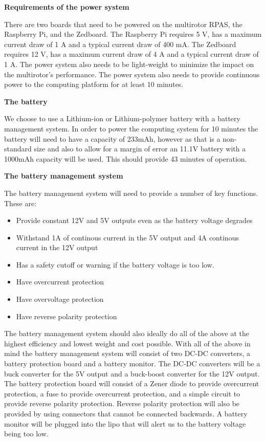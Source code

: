 \textbf{Requirements of the power system}

 There are two boards that need to be powered on the multirotor RPAS, the Raspberry Pi, and the Zedboard. The Raspberry Pi requires
5 V, has a maximum current draw of 1 A and a typical current draw of 400 mA. The Zedboard requires 12 V, has a maximum current draw of
4 A and a typical current draw of 1 A. The power system also
needs to be light-weight to minimize the impact on the multirotor's performance. The power system also needs to provide continuous power to the computing platform for at least 10 minutes.

\textbf{The battery}

We choose to use a Lithium-ion or Lithium-polymer battery with a battery management system. In order to
power the computing system for 10 minutes the battery will need to have a capacity of 233mAh, however as that is a non-standard size and also to allow for a margin of error an 11.1V battery with a 1000mAh capacity will be used. This should provide 43 minutes of operation.

\textbf{The battery management system}

The battery management system will need to provide a number of key functions. These are:
  
  \begin{itemize}
\item Provide constant 12V and 5V outputs even as the battery voltage degrades
\item Withstand 1A of continous current in the 5V output and 4A continous current in the 12V output
\item Has a safety cutoff or warning if the battery voltage is too low.
\item Have overcurrent protection
\item Have overvoltage protection
\item Have reverse polarity protection
\end{itemize}
 
The battery management system should also ideally do all of the above at the highest efficiency and lowest weight and cost possible. With all of the above in mind the battery management system will consist of two DC-DC converters, a battery protection board and a battery monitor. The DC-DC converters will be a buck converter for the 5V output and a buck-boost converter for the 12V output. The battery protection board will consist of a Zener diode to provide overcurrent protection, a fuse to provide overcurrent protection, and a simple circuit to provide reverse polarity protection. Reverse polarity protection will also be provided by using connectors that cannot be connected backwards. A battery monitor will be plugged into the lipo that will alert us to the battery voltage being too low.

